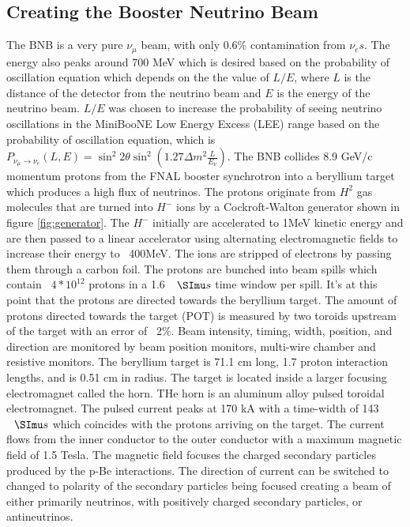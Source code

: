 \subsection{Creating the Booster Neutrino Beam}
The BNB is a very pure $\nu_{\mu}$ beam, with only 0.6\% contamination from $\nu_{e}s$. The energy also peaks around 700 MeV which is desired based on the probability of oscillation equation which depends on the the value of $L/E$, where $L$ is the distance of the detector from the neutrino beam and $E$ is the energy of the neutrino beam. $L/E$ was chosen to increase the probability of seeing neutrino oscillations in the MiniBooNE Low Energy Excess (LEE) range based on the probability of oscillation equation, which is $ P_{\nu_{\mu}\rightarrow \nu_{e}}\left(L,E\right) = \sin^2 2\theta \sin^2 \left(1.27\Delta m^2 \frac{L}{E_{\nu}}\right)$. The BNB collides 8.9 GeV/c momentum protons from the FNAL booster synchrotron into a beryllium target which produces a high flux of neutrinos. The protons originate from $H^2$ gas molecules that are turned into $H^-$ ions by a Cockroft-Walton generator shown in figure \ref{fig:generator}. The $H^-$ initially are accelerated to 1MeV kinetic energy and are then passed to a linear accelerator using alternating electromagnetic fields to increase their energy to ~400MeV. The ions are stripped of electrons by passing them through a carbon foil. The protons are bunched into beam spills which contain ~$4*10^12$ protons in a 1.6 $\micro s$ time window per spill. It's at this point that the protons are directed towards the beryllium target. The amount of protons directed towards the target (POT) is measured by two toroids upstream of the target with an error of ~2$\%$. Beam intensity, timing, width, position, and direction are monitored by beam position monitors, multi-wire chamber and resistive monitors. 
The beryllium target is 71.1 cm long, 1.7 proton interaction lengths, and is 0.51 cm in radius. The target is located inside a larger focusing electromagnet called the horn. THe horn is an aluminum alloy pulsed toroidal electromagnet. The pulsed current peaks at 170 kA with a time-width of 143 $\micro s$ which coincides with the protons arriving on the target. The current flows from the inner conductor to the outer conductor with a maximum magnetic field of 1.5 Tesla. The magnetic field focuses the charged secondary particles produced by the p-Be interactions. The direction of current can be switched to changed to polarity of the secondary particles being focused creating a beam of either primarily neutrinos, with positively charged secondary particles, or antineutrinos. 

